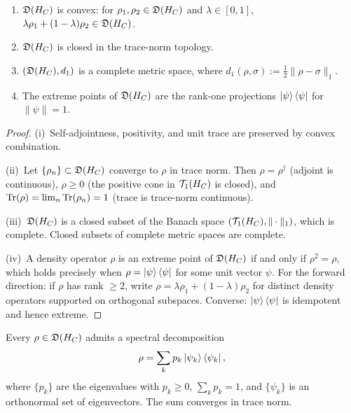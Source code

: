\begin{proposition}
\label{prop:3.3}
\begin{enumerate}
  \item[(i)] $\mathfrak{D}(H_C)$ is convex: for
    $\rho_1, \rho_2 \in \mathfrak{D}(H_C)$ and $\lambda \in [0,1]$,
    $\lambda\rho_1 + (1-\lambda)\rho_2 \in \mathfrak{D}(H_C)$.
  \item[(ii)] $\mathfrak{D}(H_C)$ is closed in the trace-norm topology.
  \item[(iii)] $(\mathfrak{D}(H_C), d_1)$ is a complete metric space,
    where $d_1(\rho, \sigma) := \tfrac{1}{2}\|\rho - \sigma\|_1$.
  \item[(iv)] The extreme points of $\mathfrak{D}(H_C)$ are the rank-one
    projections $\ket{\psi}\bra{\psi}$ for $\|\psi\| = 1$.
\end{enumerate}
\end{proposition}

\begin{proof}
(i)~Self-adjointness, positivity, and unit trace are preserved by
convex combination.

(ii)~Let $\{\rho_n\} \subset \mathfrak{D}(H_C)$ converge to $\rho$ in
trace norm.  Then $\rho = \rho^\dagger$ (adjoint is continuous),
$\rho \geq 0$ (the positive cone in $\mathcal{T}_1(H_C)$ is closed),
and $\mathrm{Tr}(\rho) = \lim_n \mathrm{Tr}(\rho_n) = 1$ (trace is trace-norm
continuous).

(iii)~$\mathfrak{D}(H_C)$ is a closed subset of the Banach space
$(\mathcal{T}_1(H_C), \|\cdot\|_1)$, which is complete.  Closed subsets
of complete metric spaces are complete.

(iv)~A density operator $\rho$ is an extreme point of $\mathfrak{D}(H_C)$
if and only if $\rho^2 = \rho$, which holds precisely when
$\rho = \ket{\psi}\bra{\psi}$ for some unit vector $\psi$.  For the
forward direction: if $\rho$ has rank $\geq 2$, write
$\rho = \lambda \rho_1 + (1-\lambda)\rho_2$ for distinct density operators
supported on orthogonal subspaces.  Converse: $\ket{\psi}\bra{\psi}$ is
idempotent and hence extreme.
\end{proof}

\begin{lemma}
\label{lem:3.5}
Every $\rho \in \mathfrak{D}(H_C)$ admits a spectral decomposition
\[
  \rho = \sum_{k} p_k \ket{\psi_k}\bra{\psi_k},
\]
where $\{p_k\}$ are the eigenvalues with $p_k \geq 0$, $\sum_k p_k = 1$,
and $\{\psi_k\}$ is an orthonormal set of eigenvectors.  The sum converges
in trace norm.
\end{lemma}


